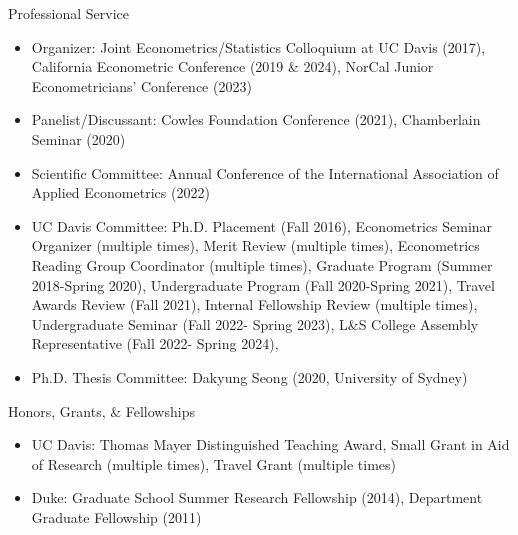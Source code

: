 \documentclass{article}
\begin{document}
\bigskip\noindent Professional Service 
\begin{itemize}
\item[] Organizer: 
Joint Econometrics/Statistics Colloquium at UC Davis (2017), %
California Econometric Conference (2019 \& 2024), %
NorCal Junior Econometricians’ Conference (2023) %
\item[] Panelist/Discussant: 
Cowles Foundation Conference (2021), %
Chamberlain Seminar (2020)%
\item[] Scientific Committee: 
Annual Conference of the International Association of Applied Econometrics (2022)
\item[] UC Davis Committee: 
Ph.D. Placement (Fall 2016), 
Econometrics Seminar Organizer  (multiple times), 
Merit Review (multiple times), 
Econometrics Reading Group Coordinator (multiple times), 
Graduate Program (Summer 2018-Spring 2020),
Undergraduate Program  (Fall 2020-Spring 2021),
Travel Awards Review  (Fall 2021),
Internal Fellowship Review  (multiple times),
Undergraduate Seminar (Fall 2022- Spring 2023), 
L\&S College Assembly Representative (Fall 2022- Spring 2024), 
\item[] Ph.D. Thesis Committee: Dakyung Seong (2020, University of Sydney)
\end{itemize}
\bigskip\noindent Honors, Grants, \& Fellowships 
\begin{itemize}
\item[] UC Davis: Thomas Mayer Distinguished Teaching Award, Small Grant in Aid of Research (multiple times), Travel Grant (multiple times)
\item[] Duke:  Graduate School Summer Research Fellowship (2014), Department Graduate Fellowship (2011)
\end{itemize}
\end{document}
